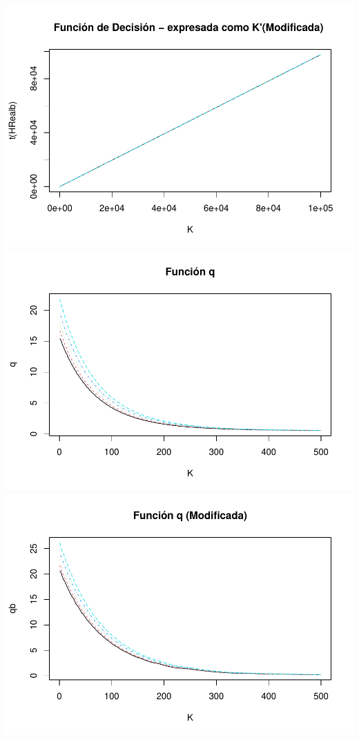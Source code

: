 \documentclass[
]{book}
\begin{document}
\includegraphics{Tarea-3-Ejercicio-3_files/figure-latex/unnamed-chunk-14-4.pdf}
\includegraphics{Tarea-3-Ejercicio-3_files/figure-latex/unnamed-chunk-14-5.pdf}
\includegraphics{Tarea-3-Ejercicio-3_files/figure-latex/unnamed-chunk-14-6.pdf}
\end{document}
